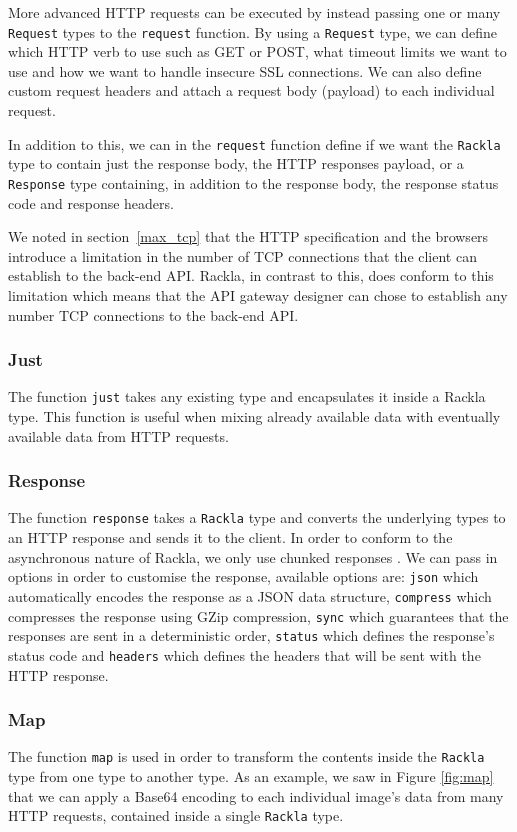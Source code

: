 \documentclass{cslthse-msc}
\begin{document}
More advanced HTTP requests can be executed by instead passing one or many \lstinline{Request} types to the \lstinline{request} function. By using a \lstinline{Request} type, we can define which HTTP verb to use such as GET or POST, what timeout limits we want to use and how we want to handle insecure SSL connections. We can also define custom request headers and attach a request body (payload) to each individual request.

In addition to this, we can in the \lstinline{request} function define if we want the \lstinline{Rackla} type to contain just the response body, the HTTP responses payload, or a \lstinline{Response} type containing, in addition to the response body, the response status code and response headers.

We noted in section~\ref{max_tcp} that the HTTP specification and the browsers introduce a limitation in the number of TCP connections that the client can establish to the back-end API. Rackla, in contrast to this, does conform to this limitation which means that the API gateway designer can chose to establish any number TCP connections to the back-end API.

\subsubsection{Just}
The function \lstinline{just} takes any existing type and encapsulates it inside a Rackla type. This function is useful when mixing already available data with eventually available data from HTTP requests.

\subsubsection{Response}
The function \lstinline{response} takes a \lstinline{Rackla} type and converts the underlying types to an HTTP response and sends it to the client. In order to conform to the asynchronous nature of Rackla, we only use chunked responses \cite{chunked}. We can pass in options in order to customise the response, available options are: \lstinline{json} which automatically encodes the response as a JSON data structure, \lstinline{compress} which compresses the response using GZip compression, \lstinline{sync} which guarantees that the responses are sent in a deterministic order, \lstinline{status} which defines the response's status code and \lstinline{headers} which defines the headers that will be sent with the HTTP response.

\subsubsection{Map}
The function \lstinline{map} is used in order to transform the contents inside the \lstinline{Rackla} type from one type to another type. As an example, we saw in Figure \ref{fig:map} that we can apply a Base64 encoding to each individual image's data from many HTTP requests, contained inside a single \lstinline{Rackla} type.
\end{document}
